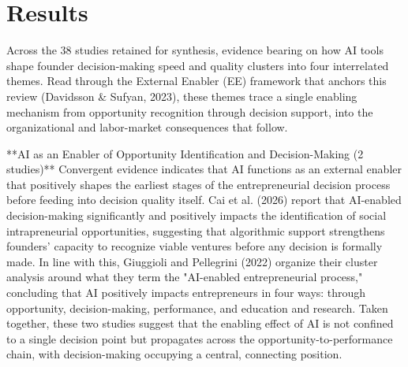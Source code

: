 \documentclass[11pt, a4paper]{article}
\begin{document}
\section{Results}
Across the 38 studies retained for synthesis, evidence bearing on how AI tools shape founder decision-making speed and quality clusters into four interrelated themes. Read through the External Enabler (EE) framework that anchors this review (Davidsson & Sufyan, 2023), these themes trace a single enabling mechanism from opportunity recognition through decision support, into the organizational and labor-market consequences that follow.

**AI as an Enabler of Opportunity Identification and Decision-Making (2 studies)**
Convergent evidence indicates that AI functions as an external enabler that positively shapes the earliest stages of the entrepreneurial decision process before feeding into decision quality itself. Cai et al. (2026) report that AI-enabled decision-making significantly and positively impacts the identification of social intrapreneurial opportunities, suggesting that algorithmic support strengthens founders' capacity to recognize viable ventures before any decision is formally made. In line with this, Giuggioli and Pellegrini (2022) organize their cluster analysis around what they term the "AI-enabled entrepreneurial process," concluding that AI positively impacts entrepreneurs in four ways: through opportunity, decision-making, performance, and education and research. Taken together, these two studies suggest that the enabling effect of AI is not confined to a single decision point but propagates across the opportunity-to-performance chain, with decision-making occupying a central, connecting position.
\end{document}
